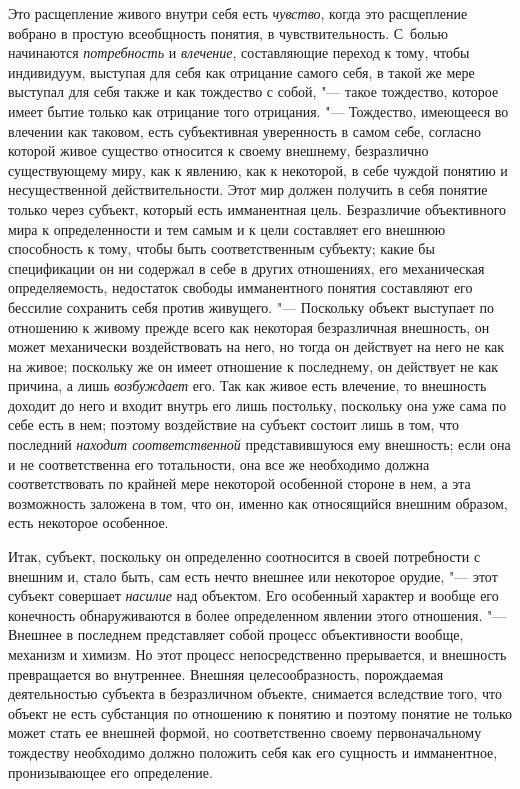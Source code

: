 Это расщепление живого внутри себя есть
{\em чувство}, когда это
расщепление вобрано в простую всеобщность понятия, в чувствительность.
С~болью начинаются {\em потребность}
и {\em влечение},
составляющие переход к тому, чтобы индивидуум, выступая для
себя как отрицание самого себя, в такой же мере выступал для себя также и
как тождество с собой, "--- такое тождество, которое имеет
бытие только как отрицание того отрицания. "--- Тождество,
имеющееся во влечении как таковом, есть субъективная уверенность в самом
себе, согласно которой живое существо относится к своему внешнему,
безразлично существующему миру, как к явлению, как к некоторой, в себе
чуждой понятию и несущественной действительности. Этот мир
должен получить в себя понятие только через субъект, который
есть имманентная цель. Безразличие объективного мира к определенности и тем
самым и к цели составляет его внешнюю способность к тому, чтобы быть
соответственным субъекту; какие бы спецификации он ни содержал в себе в
других отношениях, его механическая определяемость, недостаток свободы
имманентного понятия составляют его бессилие сохранить себя против
живущего. "--- Поскольку объект выступает по отношению к живому
прежде всего как некоторая безразличная внешность, он может механически
воздействовать на него, но тогда он действует на него не как на живое;
поскольку же он имеет отношение к последнему, он действует не как причина,
а лишь {\em возбуждает}
его. Так как живое есть влечение, то внешность доходит до
него и входит внутрь его лишь постольку, поскольку она уже сама по себе
есть в нем; поэтому воздействие на субъект состоит лишь в том, что
последний {\em находит соответственной}
представившуюся ему внешность; если она и не соответственна
его тотальности, она все же необходимо должна соответствовать по крайней
мере некоторой особенной стороне в нем, а эта возможность заложена в том,
что он, именно как относящийся внешним образом, есть некоторое особенное.

Итак, субъект, поскольку он определенно соотносится в своей
потребности с внешним и, стало быть, сам есть нечто внешнее или некоторое
орудие, "--- этот субъект совершает
{\em насилие} над
объектом. Его особенный характер и вообще его конечность обнаруживаются в
более определенном явлении этого отношения. "--- Внешнее в
последнем представляет собой процесс объективности вообще, механизм и
химизм. Но этот процесс непосредственно прерывается, и внешность
превращается во внутреннее. Внешняя целесообразность, порождаемая
деятельностью субъекта в безразличном объекте, снимается вследствие того,
что объект не есть субстанция по отношению к понятию и поэтому понятие не
только может стать ее внешней формой, но соответственно своему
первоначальному тождеству необходимо должно положить себя как его сущность
и имманентное, пронизывающее его определение.

